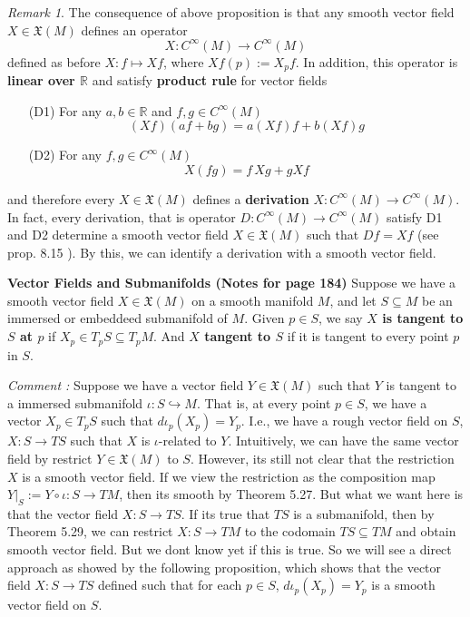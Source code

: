 \documentclass[a4paper]{article}
\theoremstyle{remark}
\newtheorem*{remark}{Remark}
\newcommand{\er}{\mathbb{R}} %
\newcommand{\subhim}{\subseteq} %
\newcommand{\CM}{C^{\infty}(M)} %
\newcommand{\VF}{\mathfrak{X}} %
\begin{document}
\begin{remark}
The consequence of above proposition is that any smooth vector field $X \in \VF(M)$ defines an operator
$$
X : \CM \to \CM
$$ 
defined as before $X : f \mapsto Xf$, where $Xf (p) := X_pf$. In addition, this operator is \textbf{linear over $\er$} and satisfy \textbf{product rule} for vector fields
\begin{enumerate}
\item[(D1)] For any $a,b \in \er$ and $ f,g \in \CM$
$$(Xf)(af+bg) = a (Xf)f + b(Xf)g$$
\item[(D2)] For any $f,g \in \CM$
$$
X(fg) = f\, Xg + g Xf
$$
\end{enumerate}
and therefore every $X \in \VF(M)$ defines a \textbf{derivation} $X : \CM \to \CM$. In fact, every derivation, that is operator $D : \CM \to \CM$ satisfy D1 and D2 determine a smooth vector field $X \in \VF(M)$ such that $Df=Xf$ (see prop. 8.15 \cite{LeeSM}). By this, we can identify a derivation with a smooth vector field. \newline

\textbf{Vector Fields and Submanifolds (Notes for page 184)} Suppose we have a smooth vector field $X \in \VF(M)$ on a smooth manifold $M$, and let $S\subhim M$ be an immersed or embeddeed submanifold of $M$. Given $p \in S$, we say \textbf{\boldmath$X$ is tangent to \boldmath$S$ at \boldmath$p$} if $X_p \in T_pS \subhim T_pM$. And \textbf{\boldmath$X$ tangent to \boldmath$S$} if it is tangent to every point $p$ in $S$. 


\textit{Comment : } Suppose we have a vector field $Y \in \VF(M)$ such that $Y$ is tangent to a immersed submanifold $ \iota : S \hookrightarrow M$. That is, at every point $p \in S$, we have a vector $X_p \in T_pS$ such that $d\iota_p(X_p) = Y_p$. I.e., we have a rough vector field on $S$, $X : S \to TS$ such that $X$ is $\iota$-related to $Y$. Intuitively, we can have the same vector field by restrict $Y \in \VF(M)$ to $S$. However, its still not clear that the restriction $X$ is a smooth vector field. If we view the restriction as the composition map $Y|_S := Y \circ \iota : S \to TM$, then its smooth by Theorem 5.27. But what we want here is that the vector field $X : S \to TS$. If its true that $TS$ is a submanifold, then by Theorem 5.29, we can restrict $X : S \to TM$ to the codomain $TS \subhim TM$ and obtain smooth vector field. But we dont know yet if this is true. So we will see a direct approach as showed by the following proposition, which shows that the vector field $X : S \to TS$ defined such that for each $p \in S$, $d\iota_p(X_p) = Y_p$ is a smooth vector field on $S$.


\end{remark}
\end{document}

